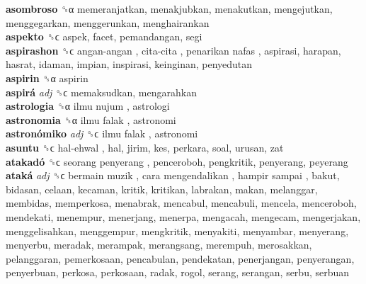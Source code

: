 \textbf{asombroso} ␝α  memeranjatkan, menakjubkan, menakutkan, mengejutkan, menggegarkan, menggerunkan, menghairankan  \\
\textbf{aspekto} ␝ϲ  aspek, facet, pemandangan, segi  \\
\textbf{aspirashon} ␝ϲ   angan-angan ,  cita-cita ,  penarikan nafas , aspirasi, harapan, hasrat, idaman, impian, inspirasi, keinginan, penyedutan  \\
\textbf{aspirin} ␝α  aspirin  \\
\textbf{aspirá} \emph{adj}  ␝ϲ  memaksudkan, mengarahkan  \\
\textbf{astrologia} ␝α   ilmu nujum , astrologi  \\
\textbf{astronomia} ␝α   ilmu falak , astronomi  \\
\textbf{astronómiko} \emph{adj}  ␝ϲ   ilmu falak , astronomi  \\
\textbf{asuntu} ␝ϲ   hal-ehwal , hal, jirim, kes, perkara, soal, urusan, zat  \\
\textbf{atakadó} ␝ϲ   seorang penyerang , penceroboh, pengkritik, penyerang, peyerang  \\
\textbf{ataká} \emph{adj}  ␝ϲ   bermain muzik ,  cara mengendalikan ,  hampir sampai , bakut, bidasan, celaan, kecaman, kritik, kritikan, labrakan, makan, melanggar, membidas, memperkosa, menabrak, mencabul, mencabuli, mencela, menceroboh, mendekati, menempur, menerjang, menerpa, mengacah, mengecam, mengerjakan, menggelisahkan, menggempur, mengkritik, menyakiti, menyambar, menyerang, menyerbu, meradak, merampak, merangsang, merempuh, merosakkan, pelanggaran, pemerkosaan, pencabulan, pendekatan, penerjangan, penyerangan, penyerbuan, perkosa, perkosaan, radak, rogol, serang, serangan, serbu, serbuan  \\
